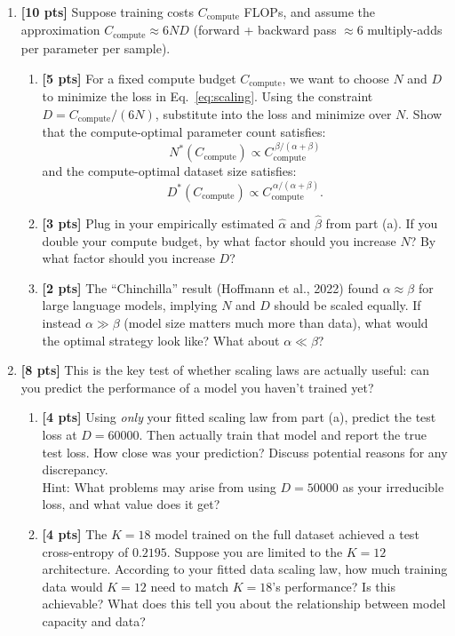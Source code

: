 \documentclass[submit]{../harvardml}
\begin{document}
\begin{problem}
\begin{enumerate}[label=(\alph*)]
\item \textbf{[10 pts]} Suppose training costs $C_{\text{compute}}$ FLOPs, and assume the approximation $C_{\text{compute}} \approx 6ND$ (forward + backward pass $\approx 6$ multiply-adds per parameter per sample).
\begin{enumerate}[label=(\roman*)]
    \item \textbf{[5 pts]} For a fixed compute budget $C_{\text{compute}}$, we want to choose $N$ and $D$ to minimize the loss in Eq.~\eqref{eq:scaling}. Using the constraint $D = C_{\text{compute}} / (6N)$, substitute into the loss and minimize over $N$. Show that the compute-optimal parameter count satisfies:
    $$
    N^*(C_{\text{compute}}) \propto C_{\text{compute}}^{\,\beta / (\alpha + \beta)}
    $$
    and the compute-optimal dataset size satisfies:
    $$
    D^*(C_{\text{compute}}) \propto C_{\text{compute}}^{\,\alpha / (\alpha + \beta)}.
    $$
    \item \textbf{[3 pts]} Plug in your empirically estimated $\hat{\alpha}$ and $\hat{\beta}$ from part (a). If you double your compute budget, by what factor should you increase $N$? By what factor should you increase $D$?
    \item \textbf{[2 pts]} The ``Chinchilla'' result (Hoffmann et al., 2022) found $\alpha \approx \beta$ for large language models, implying $N$ and $D$ should be scaled equally. If instead $\alpha \gg \beta$ (model size matters much more than data), what would the optimal strategy look like? What about $\alpha \ll \beta$?
\end{enumerate}
\item \textbf{[8 pts]} This is the key test of whether scaling laws are actually useful: can you predict the performance of a model you haven't trained yet?
\begin{enumerate}[label=(\roman*)]
    \item \textbf{[4 pts]} Using \emph{only} your fitted scaling law from part (a), predict the test loss at $D = 60000$. Then actually train that model and report the true test loss.
    How close was your prediction? Discuss potential reasons for any discrepancy. \\
    Hint: What problems may arise from using $D=50000$ as your irreducible loss, and what value does it get?
    \item \textbf{[4 pts]} The $K=18$ model trained on the full dataset achieved a test cross-entropy of $0.2195$. Suppose you are limited to the $K=12$ architecture. According to your fitted data scaling law, how much training data would $K=12$ need to match $K=18$'s performance? Is this achievable? What does this tell you about the relationship between model capacity and data?
\end{enumerate}
\end{enumerate}

\end{problem}
\end{document}
